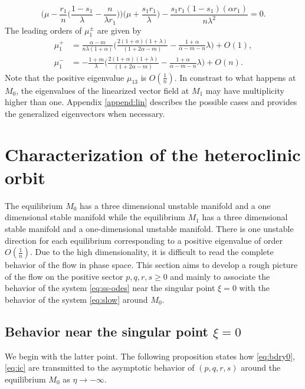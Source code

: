 \documentclass[usletter,11pt]{article}
\def\BO{{{O}}}
\theoremstyle{remark}
\begin{document}
\begin{itemize}
 $$ 
 \Big(\mu - \frac{r_1}{n}\Big(\frac{1-s_1}{\lambda}-\frac{n}{\lambda r_1}\Big)\Big)\Big(\mu + \frac{s_1r_1}{\lambda}\Big) - %
\frac{s_1r_1(1-s_1)(\alpha r_1)}{n\lambda^2} = 0.
$$
The leading orders of $\mu_1^\pm$ are given by
\begin{align*}
\mu_1^+ &= \frac{\alpha-m}{n\lambda(1+\alpha)}\Big(\frac{2(1+\alpha)(1+\lambda)}{(1+2\alpha-m) } - \frac{1+\alpha}{\alpha-m-n}\lambda\Big) + \BO(1), \\
\mu_1^- &= -\frac{1+m}{\lambda}\Big(\frac{2(1+\alpha)(1+\lambda)}{(1+2\alpha-m) } - \frac{1+\alpha}{\alpha-m-n}\lambda\Big) + \BO(n).
\end{align*}
Note that the positive eigenvalue $\mu_{13}$ is $\BO( \frac{1}{n})$.
In constrast to what happens at $M_0$, the eigenvalues of the linearized vector field at $M_1$ may have multiplicity higher than one. Appendix \ref{append:lin} describes  the possible cases and provides the generalized eigenvectors when necessary.
\end{itemize}




\section{Characterization of the heteroclinic orbit} \label{sec:char}
The equilibrium $M_0$ has a three dimensional unstable manifold and a one dimensional stable manifold while the equilibrium $M_1$ has a three dimensional
stable manifold and a one-dimensional unstable manifold. There is one unstable direction for each equilibrium corresponding to a positive
eigenvalue of order $\BO (\frac{1}{n})$.  Due to the high dimensionality, it is difficult to read the complete behavior  
of the flow in phase space. This section aims to develop a rough picture of the flow on the positive sector $p,q,r,s \ge0$ and mainly
to associate the behavior  of the system \eqref{eq:ss-odes} near the singular point $\xi = 0$ with the behavior of the system \eqref{eq:slow} around $M_0$. 

\subsection{Behavior near the singular point $\xi =0$}
We begin with the latter point. The following proposition states how \eqref{eq:bdry0}, \eqref{eq:ic} are transmitted to the asymptotic behavior of $(p,q,r,s)$
around the equilibrium $M_0$ as $\eta \to -\infty$.
\end{document}
